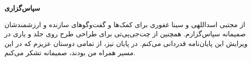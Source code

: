 \centerline{\textbf{سپاس‌گزاری}}

\vspace{\baselineskip}
از مجتبی اسداللهی و سینا غفوری برای کمک‌ها و گفت‌وگوهای سازنده و ارزشمندشان صمیمانه سپاس‌گزارم.
همچنین از چت‌جی‌پی‌تی برای طراحی طرح روی جلد و یاری در ویرایش این پایان‌نامه قدردانی می‌کنم.
در پایان نیز، از تمامی دوستان عزیزم که در این مسیر همراه من بودند، صمیمانه تشکر می‌کنم.